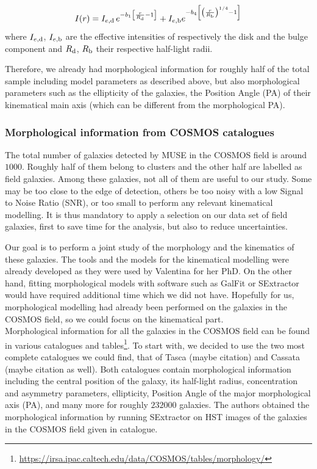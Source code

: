 \begin{equation}
	I(r) = I_{e, \rm{d}} \, e^{-b_1 \left [ \frac{r}{R_{\rm{d}}} -1 \right ]} + I_{e , \rm{b}} e^{- b_4 \left [ \left ( \frac{r}{R_{\rm{b}}} \right )^{1/4} -1 \right ]}
	\label{eq:GALFIT_light_profile}
\end{equation}
where $I_{e, \rm{d}}$, $I_{e, \rm{b}}$ are the effective intensities of respectively the disk and the bulge component and $R_{\rm{d}}$, $R_{\rm{b}}$ their respective half-light radii.

Therefore, we already had morphological information for roughly half of the total sample including model parameters as described above, but also morphological parameters such as the ellipticity of the galaxies, the Position Angle (PA) of their kinematical main axis (which can be different from the morphological PA).

\subsubsection{Morphological information from COSMOS catalogues}

The total number of galaxies detected by MUSE in the COSMOS field is around $1000$. Roughly half of them belong to clusters and the other half are labelled as field galaxies. Among these galaxies, not all of them are useful to our study. Some may be too close to the edge of detection, others be too noisy with a low Signal to Noise Ratio (SNR), or too small to perform any relevant kinematical modelling. It is thus mandatory to apply a selection on our data set of field galaxies, first to save time for the analysis, but also to reduce uncertainties.

Our goal is to perform a joint study of the morphology and the kinematics of these galaxies. The tools and the models for the kinematical modelling were already developed as they were used by Valentina for her PhD. On the other hand, fitting morphological models with software such as GalFit or SExtractor would have required additional time which we did not have. Hopefully for us, morphological modelling had already been performed on the galaxies in the COSMOS field, so we could focus on the kinematical part. \\

Morphological information for all the galaxies in the COSMOS field can be found in various catalogues and tables\footnote{\url{https://irsa.ipac.caltech.edu/data/COSMOS/tables/morphology/}}. To start with, we decided to use the two most complete catalogues we could find, that of Tasca (maybe citation) and Cassata (maybe citation as well). Both catalogues contain morphological information including the central position of the galaxy, its half-light radius, concentration and asymmetry parameters, ellipticity, Position Angle of the major morphological axis (PA), and many more for roughly $232 000$ galaxies. The authors obtained the morphological information by running SExtractor on HST images of the galaxies in the COSMOS field given in  catalogue. \\

